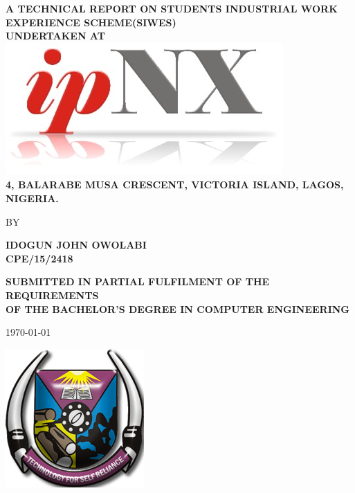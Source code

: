 \begin{titlepage}


\begin{center}
{\bf A TECHNICAL REPORT ON STUDENTS INDUSTRIAL WORK EXPERIENCE SCHEME(SIWES)\\ \vspace{.1em}UNDERTAKEN AT\\} \vspace{.7em}
\includegraphics[scale=6]{./ipnx}
{\bf \\4, BALARABE MUSA CRESCENT, VICTORIA ISLAND, LAGOS, NIGERIA.}

\end{center}

\vfill

\begin{center}
BY
\end{center}

\vfill
\begin{center}
{\large \bf IDOGUN JOHN OWOLABI\\ CPE/15/2418}\\
\end{center}


\vfill


\begin{center}
{\bf \uppercase{Submitted in partial fulfilment of the requirements \\of the Bachelor's degree in Computer Engineering}}
\end{center}

\vfill
\begin{center}
{\today}
\end{center}

\vfill
	
\begin{center}
\includegraphics[scale=4]{./futa}
\end{center}


\end{titlepage}
